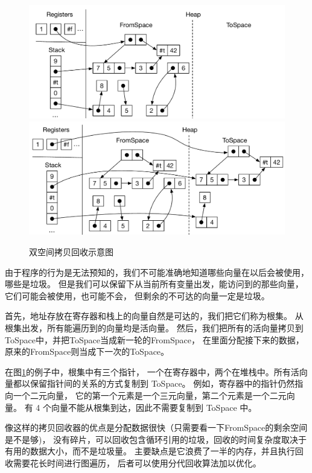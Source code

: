 \begin{figure}[t]
\centering
\includegraphics[width=\textwidth]{figures/copy-collect-1} \\[5ex]
\includegraphics[width=\textwidth]{figures/copy-collect-2}
\caption{双空间拷贝回收示意图}
\label{fig:copying-collector}
\end{figure}

由于程序的行为是无法预知的，我们不可能准确地知道哪些向量在以后会被使用，哪些是垃圾。
但是我们可以保留下从当前所有变量出发，能访问到的那些向量，它们可能会被使用，也可能不会，
但剩余的不可达的向量一定是垃圾。

首先，地址存放在寄存器和栈上的向量自然是可达的，我们把它们称为根集。
从根集出发，所有能遍历到的向量均是活向量。
然后，我们把所有的活向量拷贝到ToSpace中，并把ToSpace当成新一轮的FromSpace，
在里面分配接下来的数据，原来的FromSpace则当成下一次的ToSpace。

在图\ref{fig:copying-collector}的例子中，根集中有三个指针，
一个在寄存器中，两个在堆栈中。所有活向量都以保留指针间的关系的方式复制到 ToSpace。
例如，寄存器中的指针仍然指向一个二元向量，
它的第一个元素是一个三元向量，第二个元素是一个二元向量。
有 4 个向量不能从根集到达，因此不需要复制到 ToSpace 中。

像这样的拷贝回收器的优点是分配数据很快（只需要看一下FromSpace的剩余空间是不是够)，
没有碎片，可以回收包含循环引用的垃圾，回收的时间复杂度取决于有用的数据大小，而不是垃圾量。
主要缺点是它浪费了一半的内存，并且执行回收需要花长时间进行图遍历，
后者可以使用分代回收算法加以优化。


